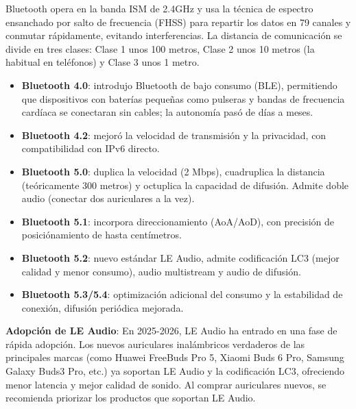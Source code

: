 
Bluetooth opera en la banda ISM de 2.4GHz y usa la técnica de espectro ensanchado por salto de frecuencia (FHSS) para repartir los datos en 79 canales y conmutar rápidamente, evitando interferencias. La distancia de comunicación se divide en tres clases: Clase 1 unos 100 metros, Clase 2 unos 10 metros (la habitual en teléfonos) y Clase 3 unos 1 metro.


\begin{itemize}
  \item \textbf{Bluetooth 4.0}: introdujo Bluetooth de bajo consumo (BLE), permitiendo que dispositivos con baterías pequeñas como pulseras y bandas de frecuencia cardíaca se conectaran sin cables; la autonomía pasó de días a meses.
  \item \textbf{Bluetooth 4.2}: mejoró la velocidad de transmisión y la privacidad, con compatibilidad con IPv6 directo.
  \item \textbf{Bluetooth 5.0}: duplica la velocidad (2 Mbps), cuadruplica la distancia (teóricamente 300 metros) y octuplica la capacidad de difusión. Admite doble audio (conectar dos auriculares a la vez).
  \item \textbf{Bluetooth 5.1}: incorpora direccionamiento (AoA/AoD), con precisión de posiciónamiento de hasta centímetros.
  \item \textbf{Bluetooth 5.2}: nuevo estándar LE Audio, admite codificación LC3 (mejor calidad y menor consumo), audio multistream y audio de difusión.
  \item \textbf{Bluetooth 5.3/5.4}: optimización adicional del consumo y la estabilidad de conexión, difusión periódica mejorada.
\end{itemize}

\textbf{Adopción de LE Audio}: En 2025-2026, LE Audio ha entrado en una fase de rápida adopción. Los nuevos auriculares inalámbricos verdaderos de las principales marcas (como Huawei FreeBuds Pro 5, Xiaomi Buds 6 Pro, Samsung Galaxy Buds3 Pro, etc.) ya soportan LE Audio y la codificación LC3, ofreciendo menor latencia y mejor calidad de sonido. Al comprar auriculares nuevos, se recomienda priorizar los productos que soportan LE Audio.


